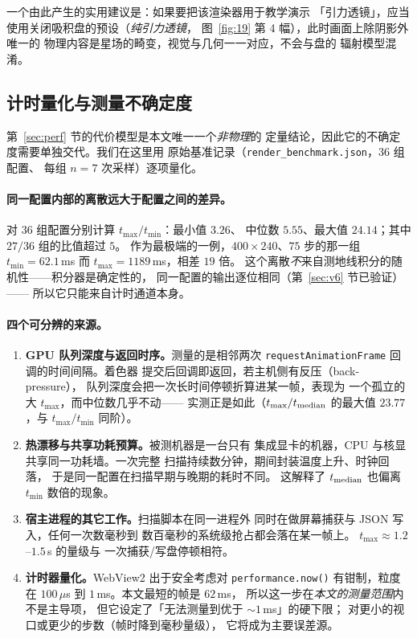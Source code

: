 一个由此产生的实用建议是：如果要把该渲染器用于教学演示
「引力透镜」，应当使用关闭吸积盘的预设（\emph{纯引力透镜}，
图~\ref{fig:19} 第 4 幅），此时画面上除阴影外唯一的
物理内容是星场的畸变，视觉与几何一一对应，不会与盘的
辐射模型混淆。

\subsection{计时量化与测量不确定度}\label{sec:discuss-quant}

第~\ref{sec:perf} 节的代价模型是本文唯一一个\emph{非物理}的
定量结论，因此它的不确定度需要单独交代。我们在这里用
原始基准记录（\texttt{render\_benchmark.json}，36 组配置、
每组 $n=7$ 次采样）逐项量化。

\paragraph{同一配置内部的离散远大于配置之间的差异。}
对 36 组配置分别计算 $t_{\max}/t_{\min}$：最小值 $3.26$、
中位数 $5.55$、最大值 $24.14$；其中 $27/36$ 组的比值超过 $5$。
作为最极端的一例，$400\times240$、$75$ 步的那一组
$t_{\min}=62.1$\,ms 而 $t_{\max}=1189$\,ms，相差 $19$ 倍。
这个离散\emph{不}来自测地线积分的随机性——积分器是确定性的，
同一配置的输出逐位相同（第~\ref{sec:v6} 节已验证）——
所以它只能来自计时通道本身。

\paragraph{四个可分辨的来源。}

\begin{enumerate}[leftmargin=1.8em,itemsep=2pt,topsep=3pt]
  \item \textbf{GPU 队列深度与返回时序。}测量的是相邻两次
        \texttt{requestAnimationFrame} 回调的时间间隔。着色器
        提交后回调即返回，若主机侧有反压（back-pressure），
        队列深度会把一次长时间停顿折算进某一帧，表现为
        一个孤立的大 $t_{\max}$，而中位数几乎不动——
        实测正是如此（$t_{\max}/t_{\rm median}$ 的最大值
        $23.77$，与 $t_{\max}/t_{\min}$ 同阶）。
  \item \textbf{热漂移与共享功耗预算。}被测机器是一台只有
        集成显卡的机器，CPU 与核显共享同一功耗墙。一次完整
        扫描持续数分钟，期间封装温度上升、时钟回落，
        于是同一配置在扫描早期与晚期的耗时不同。
        这解释了 $t_{\rm median}$ 也偏离 $t_{\min}$
        数倍的现象。
  \item \textbf{宿主进程的其它工作。}扫描脚本在同一进程外
        同时在做屏幕捕获与 JSON 写入，任何一次数毫秒到
        数百毫秒的系统级抢占都会落在某一帧上。
        $t_{\max}\approx1.2$--$1.5$\,s 的量级与
        一次捕获/写盘停顿相符。
  \item \textbf{计时器量化。}WebView2 出于安全考虑对
        \texttt{performance.now()} 有钳制，粒度在
        $100\,\mu$s 到 $1$\,ms。本文最短的帧是 $62$\,ms，
        所以这一步在\emph{本文的测量范围}内不是主导项，
        但它设定了「无法测量到优于 $\sim1$\,ms」的硬下限；
        对更小的视口或更少的步数（帧时降到毫秒量级），
        它将成为主要误差源。
\end{enumerate}

